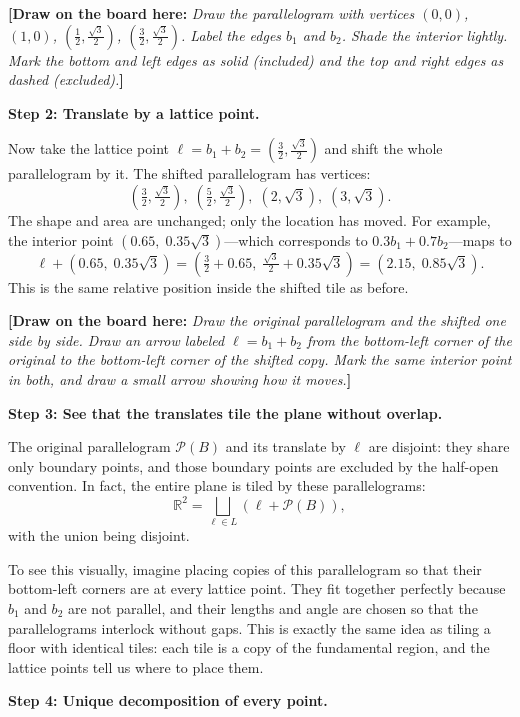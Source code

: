 \documentclass[11pt]{article}
\newcommand{\figdrawnote}[1]{\par\noindent\textbf{\textcolor{gray!60!black}{[Draw on the board here:}} \textit{#1}\textbf{\textcolor{gray!60!black}{]}}\par}
\begin{document}
\figdrawnote{Draw the parallelogram with vertices $(0,0)$, $(1,0)$, $(\tfrac12,\tfrac{\sqrt{3}}{2})$, $(\tfrac32,\tfrac{\sqrt{3}}{2})$. Label the edges $b_1$ and $b_2$. Shade the interior lightly. Mark the bottom and left edges as solid (included) and the top and right edges as dashed (excluded).}

\medskip
\noindent
\textbf{Step 2: Translate by a lattice point.}

Now take the lattice point $\ell = b_1 + b_2 = \left(\tfrac32, \tfrac{\sqrt{3}}{2}\right)$ and shift the whole parallelogram by it. The shifted parallelogram has vertices:
\[
\left(\tfrac32, \tfrac{\sqrt{3}}{2}\right),\;
\left(\tfrac52, \tfrac{\sqrt{3}}{2}\right),\;
\left(2, \sqrt{3}\right),\;
\left(3, \sqrt{3}\right).
\]
The shape and area are unchanged; only the location has moved. For example, the interior point $(0.65,\; 0.35\sqrt{3})$—which corresponds to $0.3 b_1 + 0.7 b_2$—maps to
\[
\ell + (0.65,\; 0.35\sqrt{3})
= \left(\tfrac32 + 0.65,\; \tfrac{\sqrt{3}}{2} + 0.35\sqrt{3}\right)
= (2.15,\; 0.85\sqrt{3}).
\]
This is the same relative position inside the shifted tile as before.

\figdrawnote{Draw the original parallelogram and the shifted one side by side. Draw an arrow labeled $\ell = b_1 + b_2$ from the bottom-left corner of the original to the bottom-left corner of the shifted copy. Mark the same interior point in both, and draw a small arrow showing how it moves.}

\medskip
\noindent
\textbf{Step 3: See that the translates tile the plane without overlap.}

The original parallelogram $\mathcal{P}(B)$ and its translate by $\ell$ are disjoint: they share only boundary points, and those boundary points are excluded by the half-open convention. In fact, the entire plane is tiled by these parallelograms:
\[
\mathbb{R}^2 = \bigsqcup_{\ell \in L} (\ell + \mathcal{P}(B)),
\]
with the union being disjoint.

To see this visually, imagine placing copies of this parallelogram so that their bottom-left corners are at every lattice point. They fit together perfectly because $b_1$ and $b_2$ are not parallel, and their lengths and angle are chosen so that the parallelograms interlock without gaps. This is exactly the same idea as tiling a floor with identical tiles: each tile is a copy of the fundamental region, and the lattice points tell us where to place them.

\medskip
\noindent
\textbf{Step 4: Unique decomposition of every point.}
\end{document}
